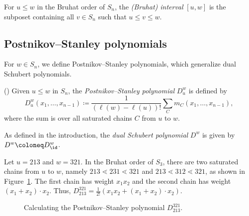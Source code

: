 For $u\le w$ in the Bruhat order of $S_n$, the \emph{(Bruhat) interval} $[u, w]$ is the subposet containing all $v\in S_n$ such that $u\le v\le w$. 

\subsection{Postnikov--Stanley polynomials}
For $w \in S_n$, we define Postnikov--Stanley polynomials, which generalize dual Schubert polynomials. 
\begin{defi}(\cite{PostnikovStanley})
    Given $u\le w $ in $ S_n$, the \emph{Postnikov--Stanley polynomial} $D_u^w$ is defined by
    \[D_u^w(x_1, \dots, x_{n-1}) \coloneqq \frac{1}{(\ell(w) - \ell(u))!}\sum_{C} m_C(x_1, \dots, x_{n-1}),\]
    where the sum is over all saturated chains $C$ from $u$ to $w$.
\end{defi}
As defined in the introduction, the \emph{dual Schubert polynomial} $D^w$ is given by $D^w\coloneq D_{\id}^w$.
\begin{exam}\label{ex:PS}
    Let $u = 213$ and $w = 321$. In the Bruhat order of $S_3$, there are two saturated chains from $u$ to $w$, namely $213\lessdot 231\lessdot 321$ and $213\lessdot 312\lessdot 321$, as shown in Figure~\ref{fig:123to321}. The first chain has weight $x_1x_2$ and the second chain has weight $(x_1 + x_2) \cdot x_2$. Thus, $D_{213}^{321} = \frac{1}{2!}(x_1 x_2 + (x_1 + x_2)\cdot x_2)$. 
\end{exam}

\begin{figure}
    \centering
    \caption{Calculating the Postnikov--Stanley polynomial $D_{213}^{321}$.}
    \label{fig:123to321}
\end{figure}

